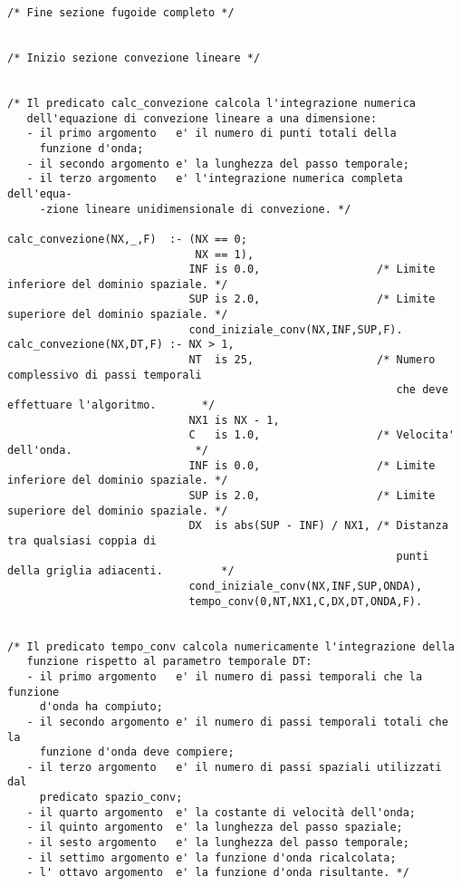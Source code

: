 \begin{verbatim}
/* Fine sezione fugoide completo */


/* Inizio sezione convezione lineare */


/* Il predicato calc_convezione calcola l'integrazione numerica
   dell'equazione di convezione lineare a una dimensione:
   - il primo argomento   e' il numero di punti totali della 
     funzione d'onda;
   - il secondo argomento e' la lunghezza del passo temporale;
   - il terzo argomento   e' l'integrazione numerica completa dell'equa-
     -zione lineare unidimensionale di convezione. */

calc_convezione(NX,_,F)  :- (NX == 0;
                             NX == 1),
                            INF is 0.0,                  /* Limite inferiore del dominio spaziale. */
                            SUP is 2.0,                  /* Limite superiore del dominio spaziale. */
                            cond_iniziale_conv(NX,INF,SUP,F).
calc_convezione(NX,DT,F) :- NX > 1,
                            NT  is 25,                   /* Numero complessivo di passi temporali
                                                            che deve effettuare l'algoritmo.       */
                            NX1 is NX - 1,
                            C   is 1.0,                  /* Velocita' dell'onda.                   */
                            INF is 0.0,                  /* Limite inferiore del dominio spaziale. */
                            SUP is 2.0,                  /* Limite superiore del dominio spaziale. */
                            DX  is abs(SUP - INF) / NX1, /* Distanza tra qualsiasi coppia di
                                                            punti della griglia adiacenti.         */
                            cond_iniziale_conv(NX,INF,SUP,ONDA),
                            tempo_conv(0,NT,NX1,C,DX,DT,ONDA,F).


/* Il predicato tempo_conv calcola numericamente l'integrazione della
   funzione rispetto al parametro temporale DT:
   - il primo argomento   e' il numero di passi temporali che la funzione
     d'onda ha compiuto;
   - il secondo argomento e' il numero di passi temporali totali che la
     funzione d'onda deve compiere; 
   - il terzo argomento   e' il numero di passi spaziali utilizzati dal
     predicato spazio_conv;
   - il quarto argomento  e' la costante di velocità dell'onda;     
   - il quinto argomento  e' la lunghezza del passo spaziale;
   - il sesto argomento   e' la lunghezza del passo temporale;
   - il settimo argomento e' la funzione d'onda ricalcolata;
   - l' ottavo argomento  e' la funzione d'onda risultante. */


\end{verbatim}
